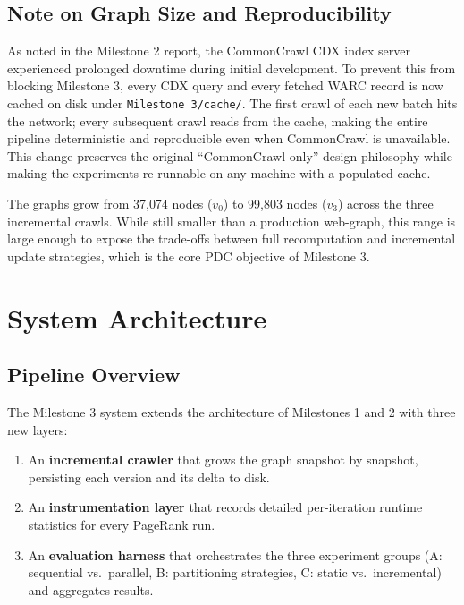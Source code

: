 \documentclass[11pt,a4paper]{article}
\begin{document}
\subsection{Note on Graph Size and Reproducibility}
As noted in the Milestone 2 report, the CommonCrawl CDX index server
experienced prolonged downtime during initial development. To prevent
this from blocking Milestone 3, every CDX query and every fetched WARC
record is now cached on disk under \texttt{Milestone 3/cache/}. The first
crawl of each new batch hits the network; every subsequent crawl reads
from the cache, making the entire pipeline deterministic and reproducible
even when CommonCrawl is unavailable. This change preserves the original
``CommonCrawl-only'' design philosophy while making the experiments
re-runnable on any machine with a populated cache.

The graphs grow from 37{,}074 nodes ($v_0$) to 99{,}803 nodes ($v_3$)
across the three incremental crawls. While still smaller than a
production web-graph, this range is large enough to expose the trade-offs
between full recomputation and incremental update strategies, which is
the core PDC objective of Milestone 3.

\section{System Architecture}

\subsection{Pipeline Overview}
The Milestone 3 system extends the architecture of Milestones 1 and 2
with three new layers:
\begin{enumerate}
    \item An \textbf{incremental crawler} that grows the graph snapshot
    by snapshot, persisting each version and its delta to disk.
    \item An \textbf{instrumentation layer} that records detailed
    per-iteration runtime statistics for every PageRank run.
    \item An \textbf{evaluation harness} that orchestrates the three
    experiment groups (A: sequential vs.~parallel, B: partitioning
    strategies, C: static vs.~incremental) and aggregates results.
\end{enumerate}
\end{document}
